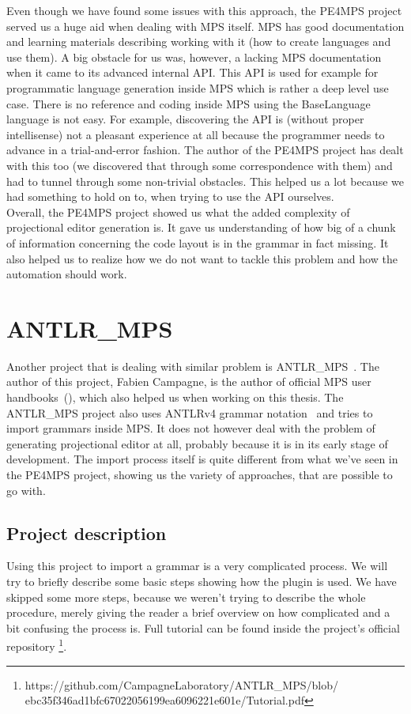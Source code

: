 Even though we have found some issues with this approach, the PE4MPS project served us a huge aid when dealing with MPS itself.
MPS has good documentation and learning materials describing working with it (how to create languages and use them).
A big obstacle for us was, however, a lacking MPS documentation when it came to its advanced internal API.
This API is used for example for programmatic language generation inside MPS which is rather a deep level use case.
There is no reference and coding inside MPS using the BaseLanguage language is not easy.
For example, discovering the API is (without proper intellisense) not a pleasant experience at all because the programmer needs to advance in a trial-and-error fashion.
The author of the PE4MPS project has dealt with this too (we discovered that through some correspondence with them) and had to tunnel through some non-trivial obstacles.
This helped us a lot because we had something to hold on to, when trying to use the API ourselves.
\\

Overall, the PE4MPS project showed us what the added complexity of projectional editor generation is.
It gave us understanding of how big of a chunk of information concerning the code layout is in the grammar in fact missing.
It also helped us to realize how we do not want to tackle this problem and how the automation should work.

\section{ANTLR{\_}MPS}
Another project that is dealing with similar problem is ANTLR{\_}MPS~\cite{ANTLR2MPS}.
The author of this project, Fabien Campagne, is the author of official MPS user handbooks~(\cite{MPS1}\cite{MPS2}), which also helped us when working on this thesis.
The ANTLR{\_}MPS project also uses ANTLRv4 grammar notation~\cite{ANTLR4} and tries to import grammars inside MPS.
It does not however deal with the problem of generating projectional editor at all, probably because it is in its early stage of development.
The import process itself is quite different from what we've seen in the PE4MPS project, showing us the variety of approaches, that are possible to go with.

\subsection{Project description}
Using this project to import a grammar is a very complicated process.
We will try to briefly describe some basic steps showing how the plugin is used.
We have skipped some more steps, because we weren't trying to describe the whole procedure, merely giving the reader a brief overview on how complicated and a bit confusing the process is.
Full tutorial can be found inside the project's official repository \footnote{https://github.com/CampagneLaboratory/ANTLR{\_}MPS/blob/ ebc35f346ad1bfc67022056199ea6096221e601e/Tutorial.pdf}.
\\

